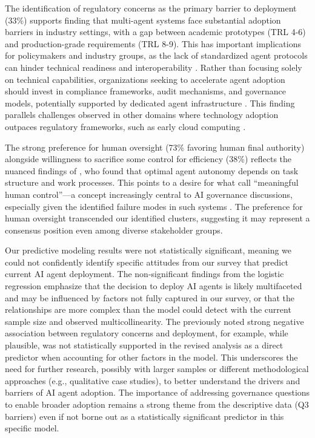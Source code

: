 \documentclass{article}
\begin{document}
The identification of regulatory concerns as the primary barrier to
deployment (33\%) supports \cite{Wrona2023} finding that
multi-agent systems face substantial adoption barriers in industry
settings, with a gap between academic prototypes (TRL 4-6) and
production-grade requirements (TRL 8-9). This has important implications for policymakers and industry groups, as the lack of standardized agent protocols can hinder technical readiness and interoperability \citep{Yang2025SurveyAIprotocols}. Rather than focusing solely on technical capabilities, organizations seeking to accelerate agent adoption should invest in compliance frameworks, audit mechanisms, and governance models, potentially supported by dedicated agent infrastructure \citep{Chan2025Infrastructure}. This finding parallels challenges observed in other
domains where technology adoption outpaces regulatory frameworks, such
as early cloud computing \cite{SchneiderSunyaev2016}.

The strong preference for human oversight (73\% favoring human final
authority) alongside willingness to sacrifice some control for
efficiency (38\%) reflects the nuanced findings of \cite{Hauptman2022}, who found that optimal agent autonomy depends on task
structure and work processes. This points to a desire for what \cite{SantoniHoven2018} call ``meaningful human control''---a concept increasingly central to AI governance discussions, especially given the identified failure modes in such systems \citep{Microsoft2024TaxonomyFailureModes}. The
preference for human oversight transcended our identified clusters,
suggesting it may represent a consensus position even among diverse
stakeholder groups.

Our predictive modeling results were not statistically significant, meaning we could not confidently identify specific attitudes from our survey that predict current AI agent deployment. The non-significant findings from the logistic regression emphasize that the decision to deploy AI agents is likely multifaceted and may be influenced by factors not fully captured in our survey, or that the relationships are more complex than the model could detect with the current sample size and observed multicollinearity. The previously noted strong negative association between regulatory concerns and deployment, for example, while plausible, was not statistically supported in the revised analysis as a direct predictor when accounting for other factors in the model. This underscores the need for further research, possibly with larger samples or different methodological approaches (e.g., qualitative case studies), to better understand the drivers and barriers of AI agent adoption. The importance of addressing governance questions to enable broader adoption remains a strong theme from the descriptive data (Q3 barriers) even if not borne out as a statistically significant predictor in this specific model.
\end{document}
